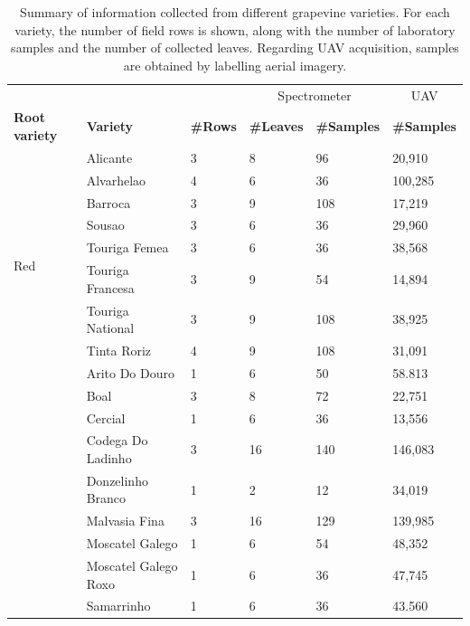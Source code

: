 \newcommand{\varietySpacing}{\hskip 0.25in}
\renewcommand{\arraystretch}{1.1}
\begin{table}[bp]
\centering
\caption{Summary of information collected from different grapevine varieties. For each variety, the number of field rows is shown, along with the number of laboratory samples and the number of collected leaves. Regarding UAV acquisition, samples are obtained by labelling aerial imagery.\\ }
\label{table:grape_samples}

\begin{tabular}{|*6{l@{\varietySpacing}|}}
\cmidrule{4-6}
\multicolumn{2}{c}{} & & \multicolumn{2}{|c|}{Spectrometer} & \multicolumn{1}{c|}{UAV}\\
\cmidrule{1-6}
\textbf{Root variety} & \textbf{Variety} & \textbf{\#Rows} & \textbf{\#Leaves} & \textbf{\#Samples} & \textbf{\#Samples}\\
\cmidrule{1-6}
\multirow{9}{*}{Red} & Alicante & 3 & 8 & 96 & 20,910\\
& Alvarhelao & 4 & 6 & 36 & 100,285\\
& Barroca & 3 & 9 & 108 & 17,219\\
& Sousao & 3 & 6 & 36 & 29,960\\
& Touriga Femea & 3 & 6 & 36 & 38,568\\
& Touriga Francesa & 3 & 9 & 54 & 14,894\\
& Touriga National & 3 & 9 & 108 & 38,925\\
& Tinta Roriz & 4 & 9 & 108 & 31,091\\
\cmidrule{1-6}
\multirow{9}{*}{White} & Arito Do Douro & 1 & 6 & 50 & 58.813\\
& Boal & 3 & 8 & 72 & 22,751\\
& Cercial & 1 & 6 & 36 & 13,556\\
& Codega Do Ladinho & 3 & 16 & 140 & 146,083\\
& Donzelinho Branco & 1 & 2 & 12 & 34,019\\
& Malvasia Fina & 3 & 16 & 129 & 139,985\\
& Moscatel Galego & 1 & 6 & 54 & 48,352\\
& Moscatel Galego Roxo & 1 & 6 & 36 & 47,745\\
& Samarrinho & 1 & 6 & 36 & 43.560\\
\bottomrule
\end{tabular}
\end{table}
\renewcommand{\arraystretch}{1}

